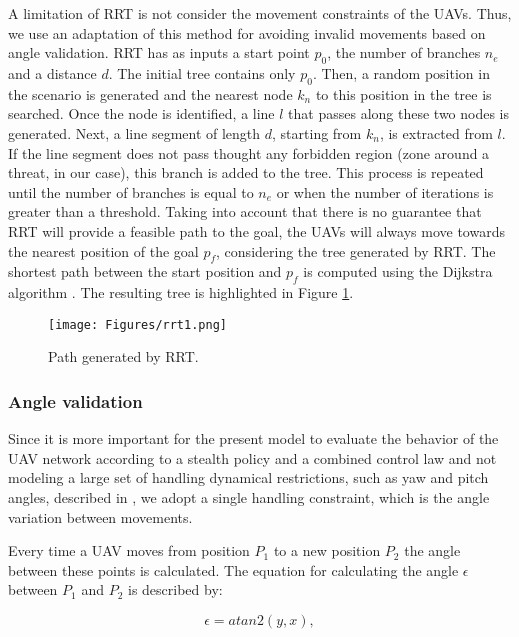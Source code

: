 A limitation of RRT is not consider the movement constraints of the UAVs. Thus, we use an adaptation of this method for avoiding invalid movements based on angle validation. RRT has as inputs a start point $p_0$, the number of branches $n_e$ and a distance $d$. The initial tree contains only $p_0$. Then, a random position in the scenario is generated and the nearest node $k_n$ to this position in the tree is searched. Once the node is identified, a line $l$ that passes along these two nodes is generated. Next, a line segment of length $d$, starting from $k_n$, is extracted from $l$. If the line segment does not pass thought any forbidden region (zone around a threat, in our case), this branch is added to the tree. This process is repeated until the number of branches is equal to $n_e$ or when the number of iterations is greater than a threshold. Taking into account that there is no guarantee that RRT will provide a feasible path to the goal, the UAVs will always move towards the nearest position of the goal $p_f$, considering the tree generated by RRT. The shortest path between the start position and $p_f$ is computed using the Dijkstra algorithm \cite{dijkstra_1959}.  The resulting tree is highlighted in Figure \ref{fig:rrt1}. 

\begin{figure}[hbt!]
\centering
\texttt{[image: Figures/rrt1.png]}
\caption{Path generated by RRT.}
\label{fig:rrt1}
\end{figure}

\subsubsection{Angle validation}

Since it is more important for the present model to evaluate the behavior of the UAV network according to a stealth policy and a combined control law and not modeling a large set of handling dynamical restrictions, such as yaw and pitch angles, described in \cite{he_2013}, we adopt a single handling constraint, which is the angle variation between movements.

Every time a UAV moves from position $P_1$ to a new position $P_2$ the angle between these points is calculated. The equation for calculating the angle $\epsilon$ between  $P_1$ and $P_2$ is described by:

\begin{equation}
    \epsilon = atan2(y,x), 
\end{equation}

